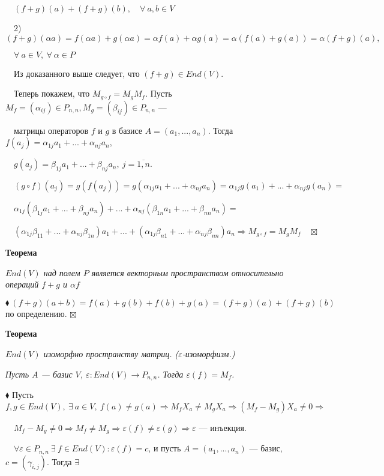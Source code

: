 \documentclass[a4paper, 12pt]{report}
\begin{document}
	$\quad (f+g)(a) + (f+g)(b),\quad \forall\ a,b \in V$
	
	$\quad$2) $(f+g)(\alpha a) = f(\alpha a) + g(\alpha a) = \alpha f(a) + \alpha g(a) = \alpha (f(a) + g(a)) = \alpha (f+g)(a), $
	
	$\quad \forall\ a \in V,\ \forall\ \alpha \in P$
	
	$\quad$Из доказанного выше следует, что $(f+g)\in End(V)$.
	
	$\quad$Теперь покажем, что $M_{g\circ f} = M_g M_f$. Пусть $M_f = (\alpha_{ij}) \in P_{n,n}, M_g = (\beta_{ij})\in P_{n,n}$ --- 
	
	$\quad$матрицы операторов $f$ и $g$ в базисе $A = (a_1,...,a_n)$. Тогда $f(a_j) = \alpha_{1j} a_1 + ... + \alpha_{nj} a_n$,
	
	$\quad g(a_j) = \beta_{1j} a_1 + ... + \beta_{nj} a_n,\ j=\overline{1,n}$.
	
	$\quad (g\circ f)(a_j) = g(f(a_j)) = g(\alpha_{1j} a_1 + ... + \alpha_{nj} a_n) = \alpha_{1j} g(a_1) + ... + \alpha_{nj} g(a_n) =$ 
	
	$\quad \alpha_{1j} (\beta_{1j} a_1 + ... + \beta_{nj} a_n) + ... + \alpha_{nj} (\beta_{1n} a_1 + ... + \beta_{nn} a_n) =$ 
	
	$\quad (\alpha_{1j}\beta_{11} + ... + \alpha_{nj}\beta_{1n}) a_1 + ... + (\alpha_{1j} \beta_{n1} + ... + \alpha_{nj} \beta_{nn}) a_n \Rightarrow M_{g\circ f} = M_g M_f\quad \boxtimes$
	\par\bigskip
	\textbf{Теорема}
	\par
	\textit{$End (V)$ над полем $P$ является векторным пространством относительно операций $f+g$ и $\alpha f$}
	\par\bigskip
	$\blacklozenge\ (f+g)(a+b) = f(a) + g(b) + f(b) + g(a) = (f+g)(a) + (f+g)(b)$ по определению. $\boxtimes$
	\par\bigskip
	\textbf{Теорема}
	\par
	\textit{$End(V)$ изоморфно пространству матриц. ($\varepsilon$-изоморфизм.)}
	\par
	\textit{Пусть $A$ --- базис $V$, $\varepsilon:End(V) \rightarrow P_{n,n}$. Тогда $\varepsilon(f) = M_f$.}
	\par\bigskip
	$\blacklozenge$ Пусть $f, g \in End(V),\ \exists\ a \in V,\ f(a)\ne g(a) \Rightarrow M_f X_a \ne M_g X_a \Rightarrow (M_f - M_g) X_a \ne 0 \Rightarrow$
	\par
	$\quad M_f - M_g \ne 0 \Rightarrow M_f \ne M_g \Rightarrow \varepsilon(f) \ne \varepsilon (g) \Rightarrow \varepsilon$ --- инъекция.
	\par\bigskip
	$\quad \forall \varepsilon \in P_{n,n}\ \exists\ f \in End(V) : \varepsilon(f) = c$, и пусть $A = (a_1,...,a_n)$ --- базис, $c = (\gamma_{i,j})$. Тогда $\exists$ 
	
\end{document}
